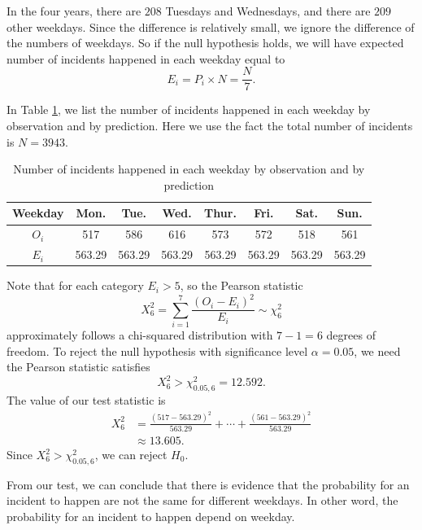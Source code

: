\documentclass[11pt,a4paper,english]{article}
\begin{document}
In the four years, there are $208$ Tuesdays and Wednesdays, and there are $209$ other weekdays. 
Since the difference is relatively small, we ignore the difference of the numbers of weekdays.
So if the null hypothesis holds, we will have expected number of incidents happened in each weekday equal to
\begin{equation*}
	E_{i} = P_{i} \times N = \frac{N}{7}.
\end{equation*}

In Table \ref{tab:weekdays}, we list the number of incidents happened in each weekday by observation and by prediction. 
Here we use the fact the total number of incidents is $N = 3943$.
\begin{table}[htbp]
	\centering
	\begin{tabular}{c|ccccccc}
		\hline
		Weekday & Mon. & Tue. & Wed. & Thur. & Fri. & Sat. & Sun.\\
		\hline
		$O_{i}$ & 517 & 586 & 616 & 573 & 572 & 518 & 561\\ \hline
		$E_{i}$ & 563.29 & 563.29 & 563.29 & 563.29 & 563.29 & 563.29 & 563.29\\
		\hline
	\end{tabular}
	\caption{Number of incidents happened in each weekday by observation and by prediction}
	\label{tab:weekdays}
\end{table}
Note that for each category $E_{i} > 5$, so the Pearson statistic
\begin{equation*}
	X^{2}_{6} = \sum_{i = 1}^{7}\frac{(O_{i} - E_{i})^{2}}{E_{i}}
	\sim \chi^{2}_{6}
\end{equation*}
approximately follows a chi-squared distribution with $7-1 = 6$ degrees of freedom. 
To reject the null hypothesis with significance level $\alpha = 0.05$, we need the Pearson statistic satisfies
\begin{equation*}
	X^{2}_{6} > \chi^{2}_{0.05,6} = 12.592.
\end{equation*}
The value of our test statistic is
\begin{align*}
	X^{2}_{6} &= \frac{(517-563.29)^{2}}{563.29}+\cdots+\frac{(561-563.29)^{2}}{563.29}\\
	&\approx 13.605.
\end{align*}
Since $X^{2}_{6} > \chi^{2}_{0.05,6}$, we can reject $H_{0}$.

From our test, we can conclude that there is evidence that the probability for an incident to happen are not the same for different weekdays. In other word, the probability for an incident to happen depend on weekday.
\end{document}
